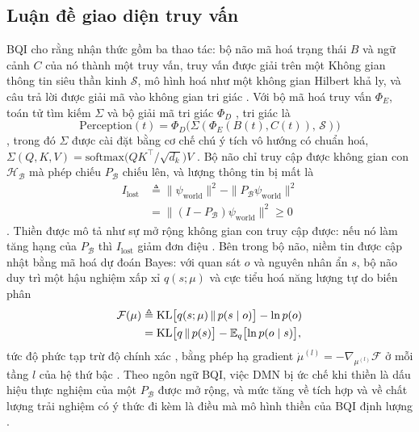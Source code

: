 \subsection{Luận đề giao diện truy vấn}
\label{sec:theory-bqi}
BQI cho rằng nhận thức gồm ba thao tác: bộ não mã hoá trạng thái $B$ và ngữ cảnh $C$ của nó thành một truy vấn, truy vấn được giải trên một Không gian thông tin siêu thần kinh $\mathcal S$, mô hình hoá như một không gian Hilbert khả ly, và câu trả lời được giải mã vào không gian tri giác \cite[Mục~3.2]{BQI}. Với bộ mã hoá truy vấn $\Phi_E$, toán tử tìm kiếm $\Sigma$ và bộ giải mã tri giác $\Phi_D$ \cite[pt.~(10)--(12)]{BQI}, tri giác là
\begin{equation}
  \mathrm{Perception}(t)=\Phi_D\bigl(\Sigma(\Phi_E(B(t),C(t)),\,\mathcal S)\bigr)
  \label{eq:bqi-perception}
\end{equation}
\cite[pt.~(13)]{BQI}, trong đó $\Sigma$ được cài đặt bằng cơ chế chú ý tích vô hướng có chuẩn hoá, $\Sigma(Q,K,V)=\mathrm{softmax}\bigl(QK^\top/\sqrt{d_k}\bigr)V$ \cite[Mục~3.3, pt.~(16)]{BQI}. Bộ não chỉ truy cập được không gian con $\mathcal H_{\mathcal B}$ mà phép chiếu $P_{\mathcal B}$ chiếu lên, và lượng thông tin bị mất là
\begin{equation}
  \begin{split}
  I_{\mathrm{lost}}&\triangleq\|\psi_{\mathrm{world}}\|^2-\|P_{\mathcal B}\psi_{\mathrm{world}}\|^2\\
  &=\|(I-P_{\mathcal B})\psi_{\mathrm{world}}\|^2\ge 0
  \end{split}
  \label{eq:bqi-loss}
\end{equation}
\cite[pt.~(14)]{BQI}. Thiền được mô tả như sự mở rộng không gian con truy cập được: nếu nó làm tăng hạng của $P_{\mathcal B}$ thì $I_{\mathrm{lost}}$ giảm đơn điệu \cite[Hệ quả~3.1, pt.~(15)]{BQI}. Bên trong bộ não, niềm tin được cập nhật bằng mã hoá dự đoán Bayes: với quan sát $o$ và nguyên nhân ẩn $s$, bộ não duy trì một hậu nghiệm xấp xỉ $q(s;\mu)$ và cực tiểu hoá năng lượng tự do biến phân
\begin{equation}
  \begin{split}
  \mathcal F(\mu)&\triangleq\mathrm{KL}\bigl[q(s;\mu)\,\|\,p(s\mid o)\bigr]-\ln p(o)\\
  &=\mathrm{KL}\bigl[q\,\|\,p(s)\bigr]-\mathbb E_q\bigl[\ln p(o\mid s)\bigr],
  \end{split}
  \label{eq:bqi-free-energy}
\end{equation}
tức độ phức tạp trừ độ chính xác \cite[Mục~3.1, Định nghĩa~3.1, pt.~(3)]{BQI}, bằng phép hạ gradient $\dot\mu^{(l)}=-\nabla_{\mu^{(l)}}\mathcal F$ ở mỗi tầng $l$ của hệ thứ bậc \cite[pt.~(7)]{BQI}. Theo ngôn ngữ BQI, việc DMN bị ức chế khi thiền là dấu hiệu thực nghiệm của một $P_{\mathcal B}$ được mở rộng, và mức tăng về tích hợp và về chất lượng trải nghiệm có ý thức đi kèm là điều mà mô hình thiền của BQI định lượng \cite[Mục~6.3, 7 và 11.1]{BQI}.

